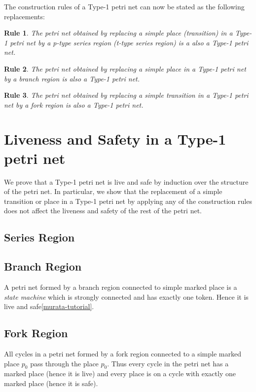 \documentclass[12pt,a4paper]{article}
\newtheorem{srule}{Rule}
\begin{document}
The construction rules of a Type-1 petri net can now be stated as the
following replacements:

\begin{srule}
  The petri net obtained by replacing a simple place (transition) in a
  Type-1 petri net by a p-type series region (t-type series region) is
  a also a Type-1 petri net.
\end{srule}

\begin{srule}
  The petri net obtained by replacing a simple place in a Type-1 petri
  net by a branch region is also a Type-1 petri net.
\end{srule}

\begin{srule}
  The petri net obtained by replacing a simple transition in a Type-1
  petri net by a fork region is also a Type-1 petri net.
\end{srule}

\section{Liveness and Safety in a Type-1 petri net}
\label{sec:live-safe}

We prove that a Type-1 petri net is live and safe by induction over
the structure of the petri net. In particular, we show that the
replacement of a simple transition or place in a Type-1 petri net by
applying any of the construction rules does not affect the liveness
and safety of the rest of the petri net.

\subsection{Series Region}
\label{sec:series-live-and-safe}

\subsection{Branch Region}
\label{sec:branch-live-and-safe}

A petri net formed by a branch region connected to simple marked place
is a \emph{state machine} which is strongly connected and has exactly
one token. Hence it is live and safe\ref{murata-tutorial}.

\subsection{Fork Region}
\label{sec:fork-live-and-safe}

All cycles in a petri net formed by a fork region connected to a
simple marked place $p_0$ pass through the place $p_0$. Thus every
cycle in the petri net has a marked place (hence it is live) and every
place is on a cycle with exactly one marked place (hence it is safe).
\end{document}
